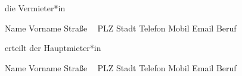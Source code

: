 \setlength{\columnsep}{2em}
\begin{multicols}{2}

die Vermieter*in
\vspace{1ex}

\ifthenelse{\equal{\VERMIETERlastname}{}}
{}
{Name \MYdotfill \textbf{ \VERMIETERlastname }\newline} 
%
\ifthenelse{\equal{\VERMIETERfirstname}{}}
{}
{Vorname \MYdotfill \textbf{ \VERMIETERfirstname }\newline} 
%
\ifthenelse{\equal{\VERMIETERstreet}{}}
{}
{Straße \MYdotfill \textbf{ \VERMIETERstreet~\VERMIETERstreetnumber }\newline} 
%
\ifthenelse{\equal{\VERMIETERzipcode}{}}
{}
{PLZ \MYdotfill \textbf{ \VERMIETERzipcode }\newline} 
%
\ifthenelse{\equal{\VERMIETERcity}{}}
{}
{Stadt \MYdotfill \textbf{ \VERMIETERcity }\newline} 
%
\ifthenelse{\equal{\VERMIETERphone}{}}
{}
{Telefon \MYdotfill \textbf{ \VERMIETERphone }\newline} 
%
\ifthenelse{\equal{\VERMIETERmobile}{}}
{}
{Mobil \MYdotfill \textbf{ \VERMIETERmobile }\newline} 
%
\ifthenelse{\equal{\VERMIETERmail}{}}
{}
{Email \MYdotfill \textbf{ \VERMIETERmail }\newline} 
%
\ifthenelse{\equal{\VERMIETERjob}{}}
{}
{Beruf \MYdotfill \textbf{ \VERMIETERjob }\newline} 

\columnbreak

erteilt der Hauptmieter*in
\vspace{1ex}

\ifthenelse{\equal{\HAUPTMIETERlastname}{}}
{}
{Name \MYdotfill \textbf{ \HAUPTMIETERlastname }\newline} 
%
\ifthenelse{\equal{\HAUPTMIETERfirstname}{}}
{}
{Vorname \MYdotfill \textbf{ \HAUPTMIETERfirstname }\newline} 
%
\ifthenelse{\equal{\HAUPTMIETERstreet}{}}
{}
{Straße \MYdotfill \textbf{ \HAUPTMIETERstreet~\HAUPTMIETERstreetnumber }\newline} 
%
\ifthenelse{\equal{\HAUPTMIETERzipcode}{}}
{}
{PLZ \MYdotfill \textbf{ \HAUPTMIETERzipcode }\newline} 
%
\ifthenelse{\equal{\HAUPTMIETERcity}{}}
{}
{Stadt \MYdotfill \textbf{ \HAUPTMIETERcity }\newline} 
%
\ifthenelse{\equal{\HAUPTMIETERphone}{}}
{}
{Telefon \MYdotfill \textbf{ \HAUPTMIETERphone }\newline} 
%
\ifthenelse{\equal{\HAUPTMIETERmobile}{}}
{}
{Mobil \MYdotfill \textbf{ \HAUPTMIETERmobile }\newline} 
%
\ifthenelse{\equal{\HAUPTMIETERmail}{}}
{}
{Email \MYdotfill \textbf{ \HAUPTMIETERmail }\newline} 
%
\ifthenelse{\equal{\HAUPTMIETERjob}{}}
{}
{Beruf \MYdotfill \textbf{ \HAUPTMIETERjob }\newline} 

\end{multicols}
\vspace{-3ex}


